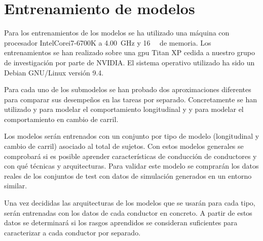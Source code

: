 \section{Entrenamiento de modelos}

Para los entrenamientos de los modelos se ha utilizado una máquina con procesador Intel\textregistered Core\texttrademark i7-6700K a \SI{4.00}{\giga\Hz} y \SI{16}{\gibi\byte} de memoria. Los entrenamientos se han realizado sobre una \gls{gpu} Titan XP cedida a nuestro grupo de investigación por parte de NVIDIA. El sistema operativo utilizado ha sido un Debian GNU/Linux versión 9.4. 

Para cada uno de los submodelos se han probado dos aproximaciones diferentes para comparar sus desempeños en las tareas por separado. Concretamente se han utilizado  y  para modelar el comportamiento longitudinal y  y  para modelar el comportamiento en cambio de carril.

Los modelos serán entrenados con un conjunto por tipo de modelo (longitudinal y cambio de carril) asociado al total de sujetos. Con estos modelos generales se comprobará si es posible aprender características de conducción de conductores y con qué técnicas y arquitecturas. Para validar este modelo se comprarán los datos reales de los conjuntos de test con datos de simulación generados en un entorno similar.

Una vez decididas las arquitecturas de los modelos que se usarán para cada tipo, serán entrenadas con los datos de cada conductor en concreto. A partir de estos datos se determinará si los rasgos aprendidos se consideran suficientes para caracterizar a cada conductor por separado.